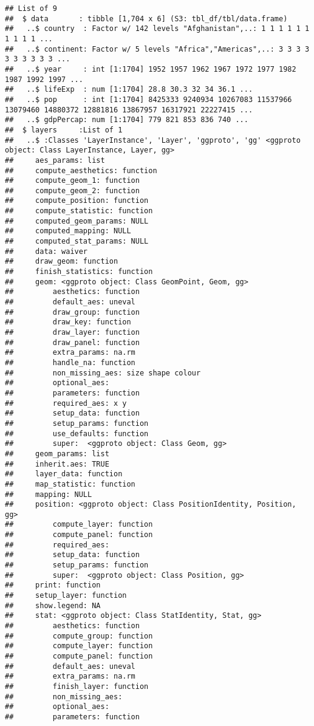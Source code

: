 \documentclass[
]{article}
\begin{document}
\begin{verbatim}
## List of 9
##  $ data       : tibble [1,704 x 6] (S3: tbl_df/tbl/data.frame)
##   ..$ country  : Factor w/ 142 levels "Afghanistan",..: 1 1 1 1 1 1 1 1 1 1 ...
##   ..$ continent: Factor w/ 5 levels "Africa","Americas",..: 3 3 3 3 3 3 3 3 3 3 ...
##   ..$ year     : int [1:1704] 1952 1957 1962 1967 1972 1977 1982 1987 1992 1997 ...
##   ..$ lifeExp  : num [1:1704] 28.8 30.3 32 34 36.1 ...
##   ..$ pop      : int [1:1704] 8425333 9240934 10267083 11537966 13079460 14880372 12881816 13867957 16317921 22227415 ...
##   ..$ gdpPercap: num [1:1704] 779 821 853 836 740 ...
##  $ layers     :List of 1
##   ..$ :Classes 'LayerInstance', 'Layer', 'ggproto', 'gg' <ggproto object: Class LayerInstance, Layer, gg>
##     aes_params: list
##     compute_aesthetics: function
##     compute_geom_1: function
##     compute_geom_2: function
##     compute_position: function
##     compute_statistic: function
##     computed_geom_params: NULL
##     computed_mapping: NULL
##     computed_stat_params: NULL
##     data: waiver
##     draw_geom: function
##     finish_statistics: function
##     geom: <ggproto object: Class GeomPoint, Geom, gg>
##         aesthetics: function
##         default_aes: uneval
##         draw_group: function
##         draw_key: function
##         draw_layer: function
##         draw_panel: function
##         extra_params: na.rm
##         handle_na: function
##         non_missing_aes: size shape colour
##         optional_aes: 
##         parameters: function
##         required_aes: x y
##         setup_data: function
##         setup_params: function
##         use_defaults: function
##         super:  <ggproto object: Class Geom, gg>
##     geom_params: list
##     inherit.aes: TRUE
##     layer_data: function
##     map_statistic: function
##     mapping: NULL
##     position: <ggproto object: Class PositionIdentity, Position, gg>
##         compute_layer: function
##         compute_panel: function
##         required_aes: 
##         setup_data: function
##         setup_params: function
##         super:  <ggproto object: Class Position, gg>
##     print: function
##     setup_layer: function
##     show.legend: NA
##     stat: <ggproto object: Class StatIdentity, Stat, gg>
##         aesthetics: function
##         compute_group: function
##         compute_layer: function
##         compute_panel: function
##         default_aes: uneval
##         extra_params: na.rm
##         finish_layer: function
##         non_missing_aes: 
##         optional_aes: 
##         parameters: function

\end{verbatim}
\end{document}
